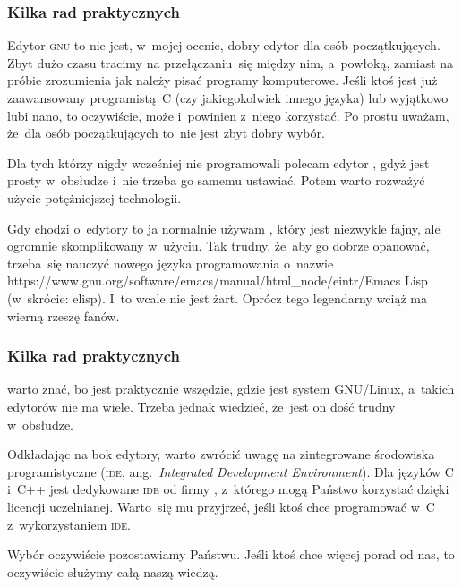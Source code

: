 \documentclass[10pt,t]{beamer}
\begin{document}
\begin{frame}
  \frametitle{Kilka rad praktycznych}


  Edytor \textsc{gnu}  to nie
  jest, w~mojej ocenie, dobry edytor dla osób początkujących. Zbyt dużo
  czasu tracimy na przełączaniu~się między nim, a~powłoką, zamiast na
  próbie zrozumienia jak należy pisać programy komputerowe. Jeśli ktoś jest
  już zaawansowany programistą~C (czy jakiegokolwiek innego języka) lub
  wyjątkowo lubi nano, to oczywiście, może i~powinien z~niego korzystać.
  Po prostu uważam, że~dla osób początkujących to~nie jest zbyt dobry wybór.

  Dla tych którzy nigdy wcześniej nie programowali polecam edytor
  , gdyż jest prosty
  w~obsłudze i~nie trzeba go samemu ustawiać. Potem warto rozważyć użycie
  potężniejszej technologii.

  Gdy chodzi o~edytory to ja normalnie używam
  ,
  który jest niezwykle fajny, ale ogromnie skomplikowany w~użyciu.
  Tak trudny, że~aby go dobrze opanować, trzeba~się nauczyć nowego języka
  programowania o~nazwie 
  {https://www.gnu.org/software/emacs/manual/html_node/eintr/}{Emacs Lisp}
  (w~skrócie: elisp). I~to wcale nie jest żart. Oprócz tego legendarny
   wciąż ma wierną rzeszę fanów.

\end{frame}





\begin{frame}
  \frametitle{Kilka rad praktycznych}


   warto znać, bo jest praktycznie
  wszędzie, gdzie jest system GNU/Linux, a~takich edytorów nie ma wiele.
  Trzeba jednak wiedzieć, że~jest on dość trudny w~obsłudze.

  Odkładając na bok edytory, warto zwrócić uwagę na zintegrowane środowiska
  programistyczne (\textsc{ide}, ang.~\textit{Integrated Development
    Environment}). Dla języków C i~C++ jest dedykowane \textsc{ide}
   od firmy
  , z~którego mogą Państwo
  korzystać dzięki licencji uczelnianej. Warto~się mu przyjrzeć, jeśli
  ktoś chce programować w~C z~wykorzystaniem \textsc{ide}.

  Wybór oczywiście pozostawiamy Państwu. Jeśli ktoś chce więcej porad
  od nas, to oczywiście służymy całą naszą wiedzą.

\end{frame}
\end{document}
